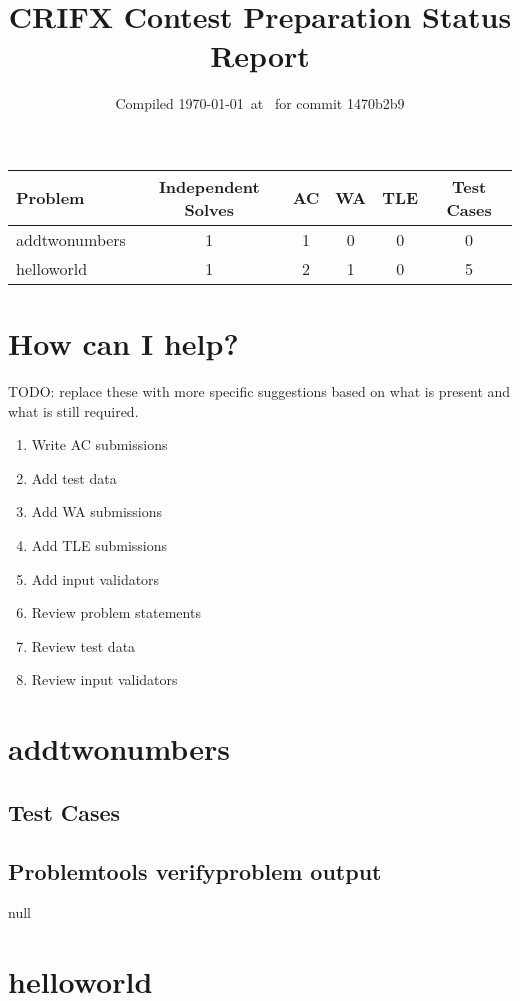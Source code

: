 \documentclass{article}%
\title{CRIFX Contest Preparation Status Report}%
\date{Compiled \today~at \DTMcurrenttime\DTMcurrentzone~for commit 1470b2b9}%
\begin{document}
%
\normalsize%
\maketitle%
\begin{tabular}{|l|c|c|c|c|c|}%
\hline%
\rowcolor{cyan}%
Problem&Independent Solves&AC&WA&TLE&Test Cases\\%
\hline%
addtwonumbers&1&1&0&0&0\\%
\hline%
helloworld&1&2&1&0&5\\%
\hline%
\end{tabular}%
\section{How can I help?}%
\label{sec:HowcanIhelp?}%
TODO: replace these with more specific suggestions based on what is present and what is still required.%
\begin{enumerate}%
\item%
Write AC submissions%
\item%
Add test data%
\item%
Add WA submissions%
\item%
Add TLE submissions%
\item%
Add input validators%
\item%
Review problem statements%
\item%
Review test data%
\item%
Review input validators%
\end{enumerate}

%
\newpage%
\section{addtwonumbers}%
\label{sec:addtwonumbers}%
\subsection{Test Cases}%
\label{subsec:TestCases}%

%
\subsection{Problemtools verifyproblem output}%
\label{subsec:Problemtoolsverifyproblemoutput}%
null

%
\newpage%
\section{helloworld}%
\label{sec:helloworld}%
\end{document}

